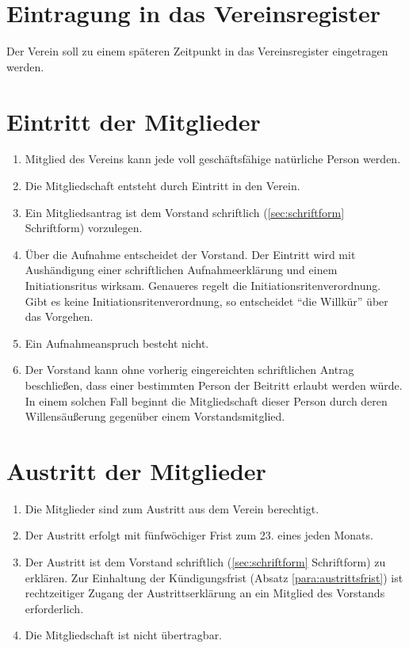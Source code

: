 \documentclass[a4paper]{article}
\begin{document}
\section{Eintragung in das Vereinsregister}\label{sec:eintragung_in_das_vereinsregister}

Der Verein soll zu einem späteren Zeitpunkt in das Vereinsregister eingetragen werden.


\section{Eintritt der Mitglieder}\label{sec:eintritt_der_mitglieder}

\begin{enumerate}
\item Mitglied des Vereins kann jede voll geschäftsfähige natürliche Person werden.
\item Die Mitgliedschaft entsteht durch Eintritt in den Verein.
\item Ein Mitgliedsantrag ist dem Vorstand schriftlich (\ref{sec:schriftform} Schriftform) vorzulegen.
\item Über die Aufnahme entscheidet der Vorstand. Der Eintritt wird mit Aushändigung einer schriftlichen Aufnahmeerklärung und einem Initiationsritus wirksam. Genaueres regelt die Initiationsritenverordnung. Gibt es keine Initiationsritenverordnung, so entscheidet "`die Willkür"' über das Vorgehen.
\item Ein Aufnahmeanspruch besteht nicht.
\item Der Vorstand kann ohne vorherig eingereichten schriftlichen Antrag beschließen, dass einer bestimmten Person der Beitritt erlaubt werden würde. In einem solchen Fall beginnt die Mitgliedschaft dieser Person durch deren Willensäußerung gegenüber einem Vorstandsmitglied.
\end{enumerate}


\section{Austritt der Mitglieder}\label{sec:austritt_der_mitglieder}

\begin{enumerate}
\item Die Mitglieder sind zum Austritt aus dem Verein berechtigt.
\item Der Austritt erfolgt mit fünfwöchiger Frist zum 23. eines jeden Monats.\label{para:austrittsfrist}
\item Der Austritt ist dem Vorstand schriftlich (\ref{sec:schriftform} Schriftform) zu erklären. Zur Einhaltung der Kündigungsfrist (Absatz \ref{para:austrittsfrist}) ist rechtzeitiger Zugang der Austrittserklärung an ein Mitglied des Vorstands erforderlich.
\item Die Mitgliedschaft ist nicht übertragbar.
\end{enumerate}
\end{document}
